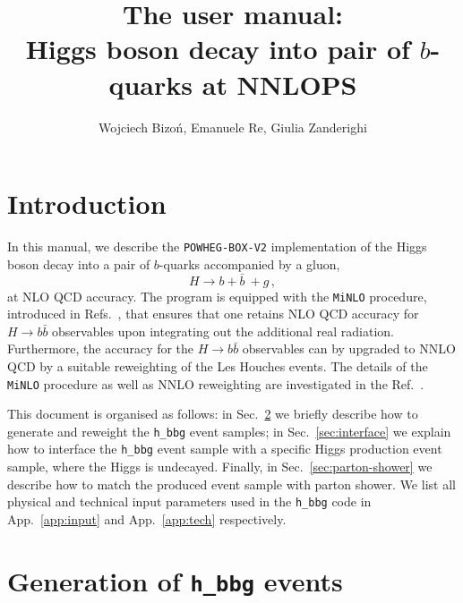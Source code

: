 \documentclass[11pt,a4paper]{article}\pdfoutput=1
\title{The \POWHEGBOXVTWO{} user manual:\\ Higgs boson decay into pair of $b$-quarks at NNLOPS}
\author{Wojciech Bizo\'n, Emanuele Re, Giulia Zanderighi}
\newcommand{\POWHEGBOXVTWO}{{\tt{POWHEG-BOX-V2}}}
\newcommand{\MINLO}{{\tt{MiNLO}}}
\newcommand{\hbbg}{{\tt{h\_bbg}}}
\newcommand{\Hbb}[1]{\ensuremath{H\to b\bar{b}{#1}}}
\begin{document}
\maketitle \flushbottom
{}

\section{Introduction}
\label{sec:intro}

In this manual, we describe the \POWHEGBOXVTWO{} implementation of the
Higgs boson decay into a pair of $b$-quarks accompanied by a gluon,
\begin{equation}
  H \longrightarrow b + \bar{b}~ + g \,,
\end{equation}
at NLO QCD accuracy.
%
The program is equipped with the \MINLO{} procedure, introduced in
Refs.~\cite{Hamilton:2012np,Hamilton:2012rf}, that ensures that one
retains NLO QCD accuracy for \Hbb{} observables upon integrating out
the additional real radiation.
%
Furthermore, the accuracy for the \Hbb{} observables can by upgraded
to NNLO QCD by a suitable reweighting of the Les Houches events.
%
The details of the \MINLO{} procedure as well as NNLO reweighting are
investigated in the Ref.~\cite{hbbg-paper}.

This document is organised as follows: in Sec.~\ref{sec:generation} we
briefly describe how to generate and reweight the \hbbg{} event
samples; in Sec.~\ref{sec:interface} we explain how to interface the
\hbbg{} event sample with a specific Higgs production event
sample, where the Higgs is undecayed. Finally, in Sec.~\ref{sec:parton-shower} we describe how to
match the produced event sample with parton shower. We list all
physical and technical input parameters used in the \hbbg{} code in
App.~\ref{app:input} and App.~\ref{app:tech} respectively.



\section{Generation of \hbbg{} events}
\label{sec:generation}

\end{document}
